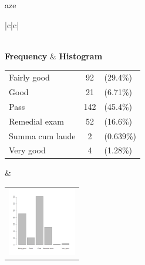  aze 
  \begin{center}
    \addtolength{\leftskip}{-4cm}\addtolength{\rightskip}{-4cm}
    \begin{tabular}{|c|c|}

      \hline
        \\
      \hline
        {\bf Frequency} & {\bf Histogram}  \\
          \begin{tabular}{@{}l@{ : }cl@{}}
            Fairly good & 92 &(29.4\%) \\
            Good & 21 &(6.71\%) \\
            Pass & 142 &(45.4\%) \\
            Remedial exam & 52 &(16.6\%) \\
            Summa cum laude & 2 &(0.639\%) \\
            Very good & 4 &(1.28\%) \\
          \end{tabular}
      &
          \begin{tabular}{@{}l@{}}
            \includegraphics[width=3cm]{graphUniv/V7-barplot}
          \end{tabular}
      \\ \hline 

    \end{tabular}
  \end{center}
  
  



